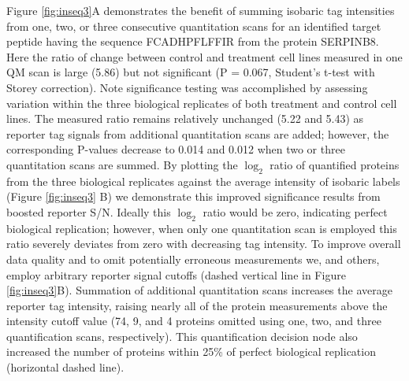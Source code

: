 Figure \ref{fig:inseq3}A demonstrates the benefit of summing isobaric tag intensities from one, two, or three consecutive quantitation scans for an \inseq{} identified target peptide having the sequence FCADHPFLFFIR from the protein SERPINB8. Here the ratio of change between control and treatment cell lines measured in one QM scan is large (5.86) but not significant (P = 0.067, Student's t-test with Storey correction).\cite{storey} Note significance testing was accomplished by assessing variation within the three biological replicates of both treatment and control cell lines. The measured ratio remains relatively unchanged (5.22 and 5.43) as reporter tag signals from additional quantitation scans are added; however, the corresponding P-values decrease to 0.014 and 0.012 when two or three quantitation scans are summed. By plotting the $\log_2$ ratio of quantified proteins from the three biological replicates against the average intensity of isobaric labels (Figure \ref{fig:inseq3} B) we demonstrate this improved significance results from boosted reporter S/N. Ideally this $\log_2$ ratio would be zero, indicating perfect biological replication; however, when only one quantitation scan is employed this ratio severely deviates from zero with decreasing tag intensity. To improve overall data quality and to omit potentially erroneous measurements we, and others, employ arbitrary reporter signal cutoffs (dashed vertical line in Figure \ref{fig:inseq3}B). Summation of additional quantitation scans increases the average reporter tag intensity, raising nearly all of the protein measurements above the intensity cutoff value (74, 9, and 4 proteins omitted using one, two, and three quantification scans, respectively). This quantification decision node also increased the number of proteins within 25\% of perfect biological replication (horizontal dashed line).

